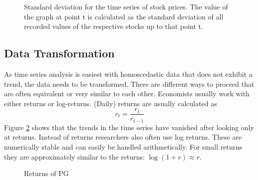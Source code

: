 \begin{figure}[H]
    \centering
    \begin{adjustbox}{width=.9\textwidth,center}
    
    \end{adjustbox}  
    \caption{Standard deviation for the time series of stock prices. The value of the graph at point t is calculated as the standard deviation of all recorded values of the respective stocks up to that point t.}
    \label{fig:cum_sd_all}
\end{figure}{}


\subsection{Data Transformation}
As time series analysis is easiest with homoscedastic data that does not exhibit a trend, the data needs to be transformed. There are different ways to proceed that are often equivalent or very similar to each other. Economists usually work with either returns or log-returns. (Daily) returns are usually calculated as
\begin{equation*}
    r_t = \frac{r_t}{r_{t-1}}
\end{equation*}{}
Figure \ref{fig:returns_all_stocks} shows that the trends in the time series have vanished after looking only at returns. Instead of returns researchers also often use log returns. These are numerically stable and can easily be handled arithmetically. For small returns they are approximately similar to the returns: $ \log(1 + r) \approx r$. 

\begin{figure}[h]
    \centering
    \caption{Returns of PG}
    \label{fig:returns_all_stocks}
\end{figure}{}


